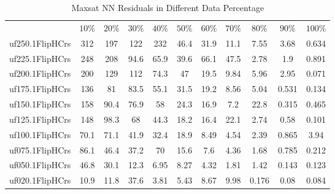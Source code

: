 \begin{table}[htbp]
\caption{Maxsat NN Residuals in Different Data Percentage}
\centering
\begin{tabular}{|ccccccccccc|}
\hline
 & $10\%$ & $20\%$ & $30\%$ & $40\%$ & $50\%$ & $60\%$ & $70\%$ & $80\%$ & $90\%$ & $100\%$ \\
uf250.1FlipHCrs &  312 &  197 &  122 &  232 & 46.4 & 31.9 & 11.1 & 7.55 & 3.68 & 0.634 \\
uf225.1FlipHCrs &  248 &  208 & 94.6 & 65.9 & 39.6 & 66.1 & 47.5 & 2.78 &  1.9 & 0.891 \\
uf200.1FlipHCrs &  200 &  129 &  112 & 74.3 &   47 & 19.5 & 9.84 & 5.96 & 2.95 & 0.071 \\
uf175.1FlipHCrs &  136 &   81 & 83.5 & 55.1 & 31.5 & 19.2 & 8.56 & 5.04 & 0.531 & 0.134 \\
uf150.1FlipHCrs &  158 & 90.4 & 76.9 &   58 & 24.3 & 16.9 &  7.2 & 22.8 & 0.315 & 0.465 \\
uf125.1FlipHCrs &  148 & 98.3 &   68 & 44.3 & 18.2 & 16.4 & 22.1 & 2.74 & 0.58 & 0.101 \\
uf100.1FlipHCrs & 70.1 & 71.1 & 41.9 & 32.4 & 18.9 & 8.49 & 4.54 & 2.39 & 0.865 & 3.94 \\
uf075.1FlipHCrs & 86.1 & 46.4 & 37.2 &   70 & 15.6 &  7.6 & 4.36 & 1.68 & 0.785 & 0.212 \\
uf050.1FlipHCrs & 46.8 & 30.1 & 12.3 & 6.95 & 8.27 & 4.32 & 1.81 & 1.42 & 0.143 & 0.123 \\
uf020.1FlipHCrs & 10.9 & 11.8 & 37.6 & 3.81 & 5.43 & 8.67 & 9.98 & 0.176 & 0.08 & 0.084 \\
\hline
\end{tabular}
\end{table}
